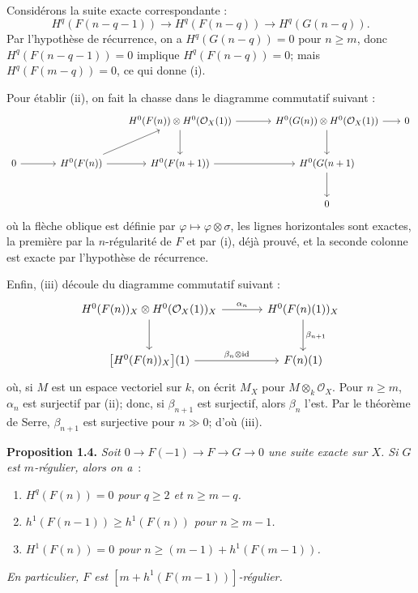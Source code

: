 Considérons la suite exacte correspondante :
\[
H^q(F(n-q-1))\longrightarrow H^q(F(n-q))\longrightarrow H^q(G(n-q)).
\]
Par l'hypothèse de récurrence, on a \(H^q(G(n-q))=0\) pour \(n\ge m\), donc \(H^q(F(n-q-1))=0\) implique \(H^q(F(n-q))=0\); mais \(H^q(F(m-q))=0\), ce qui donne (i).

Pour établir (ii), on fait la chasse dans le diagramme commutatif suivant :
\[
\begin{tikzcd}[column sep=1.8em,row sep=2.5em]
 & & & H^0(F(n))\otimes H^0(\mathcal O_X(1)) \arrow[rr] \arrow[d]
 & & H^0(G(n))\otimes H^0(\mathcal O_X(1)) \arrow[r] \arrow[d]
 & 0 \\
0 \arrow[rr]
& & H^0(F(n)) \arrow[ur] \arrow[r]
& H^0(F(n+1)) \arrow[rr]
& & H^0(G(n+1) \arrow[d] \\
& & & & & 0
\end{tikzcd}
\]
où la flèche oblique est définie par \(\varphi\mapsto\varphi\otimes\sigma\), les lignes horizontales sont exactes, la première par la \(n\)-régularité de \(F\) et par (i), déjà prouvé, et la seconde colonne est exacte par l'hypothèse de récurrence.

Enfin, (iii) découle du diagramme commutatif suivant :
\[
\begin{tikzcd}[column sep=large,row sep=large]
H^0(F(n))_X\otimes H^0(\mathcal O_X(1))_X
  \arrow[r,"\alpha_n"]
  \arrow[d]
& H^0(F(n)(1))_X
  \arrow[d,"\beta_{n+1}"] \\
\bigl[H^0(F(n))_X\bigr](1)
  \arrow[r,"\beta_n\otimes\mathrm{id}"]
& F(n)(1)
\end{tikzcd}
\]
où, si \(M\) est un
espace vectoriel sur \(k\), on écrit \(M_X\) pour \(M\otimes_k\mathcal O_X\). Pour \(n\ge m\), \(\alpha_n\) est surjectif par (ii); donc, si \(\beta_{n+1}\) est surjectif, alors \(\beta_n\) l'est. Par le théorème de Serre, \(\beta_{n+1}\) est surjective pour \(n\gg0\); d'où (iii).

\textbf{Proposition 1.4.} \emph{Soit \(0\to F(-1)\to F\to G\to0\) une suite exacte sur \(X\). Si \(G\) est \(m\)-régulier, alors on a}~:
\begin{enumerate}[label=(\roman*)]
\item \emph{\(H^q(F(n))=0\) pour \(q\ge2\) et \(n\ge m-q\).}
\item \emph{\(h^1(F(n-1))\ge h^1(F(n))\) pour \(n\ge m-1\).}
\item \emph{\(H^1(F(n))=0\) pour \(n\ge (m-1)+h^1(F(m-1))\).}
\end{enumerate}
\emph{En particulier, \(F\) est \([m+h^1(F(m-1))]\)-régulier.}

